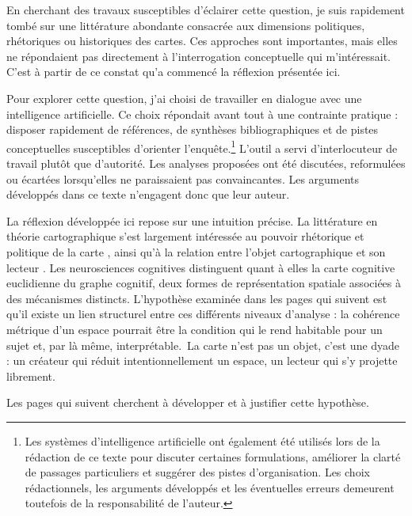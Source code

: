 En cherchant des travaux susceptibles d'éclairer cette question, je suis rapidement tombé sur une littérature abondante consacrée aux dimensions politiques, rhétoriques ou historiques des cartes. Ces approches sont importantes, mais elles ne répondaient pas directement à l'interrogation conceptuelle qui m'intéressait. C'est à partir de ce constat qu'a commencé la réflexion présentée ici.

Pour explorer cette question, j'ai choisi de travailler en dialogue avec une intelligence artificielle. Ce choix répondait avant tout à une contrainte pratique : disposer rapidement de références, de synthèses bibliographiques et de pistes conceptuelles susceptibles d'orienter l'enquête.\footnote{Les systèmes d'intelligence artificielle ont également été utilisés lors de la rédaction de ce texte pour discuter certaines formulations, améliorer la clarté de passages particuliers et suggérer des pistes d'organisation. Les choix rédactionnels, les arguments développés et les éventuelles erreurs demeurent toutefois de la responsabilité de l'auteur.} L'outil a servi d'interlocuteur de travail plutôt que d'autorité. Les analyses proposées ont été discutées, reformulées ou écartées lorsqu'elles ne paraissaient pas convaincantes. Les arguments développés dans ce texte n'engagent donc que leur auteur.

La réflexion développée ici repose sur une intuition précise. La littérature en théorie cartographique s'est largement intéressée au pouvoir rhétorique et politique de la carte \parencite{harley2001, wood1992}, ainsi qu'à la relation entre l'objet cartographique et son lecteur \parencite{denil2021}. Les neurosciences cognitives distinguent quant à elles la carte cognitive euclidienne du graphe cognitif, deux formes de représentation spatiale associées à des mécanismes distincts. L'hypothèse examinée dans les pages qui suivent est qu'il existe un lien structurel entre ces différents niveaux d'analyse : la cohérence métrique d'un espace pourrait être la condition qui le rend habitable pour un sujet et, par là même, interprétable. La carte n’est pas un objet, c’est une dyade : un créateur qui réduit intentionnellement un espace, un lecteur qui s’y projette librement.

Les pages qui suivent cherchent à développer et à justifier cette hypothèse.

